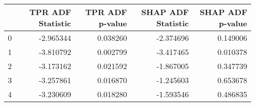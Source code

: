 \begin{tabular}{lrrrr}
\toprule
 & TPR ADF Statistic & TPR ADF p-value & SHAP ADF Statistic & SHAP ADF p-value \\
\midrule
0 & -2.965344 & 0.038260 & -2.374696 & 0.149006 \\
1 & -3.810792 & 0.002799 & -3.417465 & 0.010378 \\
2 & -3.173162 & 0.021592 & -1.867005 & 0.347739 \\
3 & -3.257861 & 0.016870 & -1.245603 & 0.653678 \\
4 & -3.230609 & 0.018280 & -1.593546 & 0.486835 \\
\bottomrule
\end{tabular}
